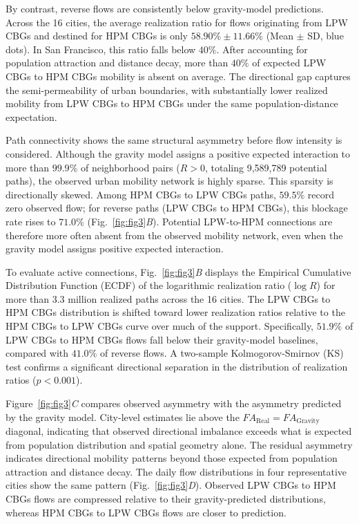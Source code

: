 \documentclass[9pt,twocolumn,twoside]{pnas-new}
\begin{document}
By contrast, reverse flows are consistently below gravity-model predictions. Across the 16 cities, the average realization ratio for flows originating from LPW CBGs and destined for HPM CBGs is only $58.90\% \pm 11.66\%$ (Mean $\pm$ SD, blue dots). In San Francisco, this ratio falls below $40\%$. After accounting for population attraction and distance decay, more than $40\%$ of expected LPW CBGs to HPM CBGs mobility is absent on average. The directional gap captures the semi-permeability of urban boundaries, with substantially lower realized mobility from LPW CBGs to HPM CBGs under the same population-distance expectation.

Path connectivity shows the same structural asymmetry before flow intensity is considered. Although the gravity model assigns a positive expected interaction to more than $99.9\%$ of neighborhood pairs ($R > 0$, totaling 9,589,789 potential paths), the observed urban mobility network is highly sparse. This sparsity is directionally skewed. Among HPM CBGs to LPW CBGs paths, $59.5\%$ record zero observed flow; for reverse paths (LPW CBGs to HPM CBGs), this blockage rate rises to $71.0\%$ (Fig.~\ref{fig:fig3}\textit{B}). Potential LPW-to-HPM connections are therefore more often absent from the observed mobility network, even when the gravity model assigns positive expected interaction.

To evaluate active connections, Fig.~\ref{fig:fig3}\textit{B} displays the Empirical Cumulative Distribution Function (ECDF) of the logarithmic realization ratio ($\log R$) for more than 3.3 million realized paths across the 16 cities. The LPW CBGs to HPM CBGs distribution is shifted toward lower realization ratios relative to the HPM CBGs to LPW CBGs curve over much of the support. Specifically, $51.9\%$ of LPW CBGs to HPM CBGs flows fall below their gravity-model baselines, compared with $41.0\%$ of reverse flows. A two-sample Kolmogorov-Smirnov (KS) test confirms a significant directional separation in the distribution of realization ratios ($p < 0.001$).

Figure~\ref{fig:fig3}\textit{C} compares observed asymmetry with the asymmetry predicted by the gravity model. City-level estimates lie above the $FA_{\mathrm{Real}} = FA_{\mathrm{Gravity}}$ diagonal, indicating that observed directional imbalance exceeds what is expected from population distribution and spatial geometry alone. The residual asymmetry indicates directional mobility patterns beyond those expected from population attraction and distance decay. The daily flow distributions in four representative cities show the same pattern (Fig.~\ref{fig:fig3}\textit{D}). Observed LPW CBGs to HPM CBGs flows are compressed relative to their gravity-predicted distributions, whereas HPM CBGs to LPW CBGs flows are closer to prediction.
\end{document}

